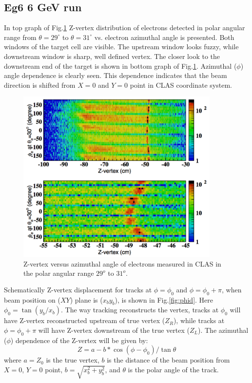 \documentclass[12pt]{article}
\begin{document}
\subsection{Eg6 6 GeV run}

In top graph of Fig.\ref{fig:phiz} Z-vertex distribution of electrons detected in polar angular range from $\theta=29^\circ$ to $\theta =31^\circ$ vs. electron azimuthal angle is presented. Both windows of the target cell are visible. The upstream window looks fuzzy, while downstream window is sharp, well defined vertex. The closer look to the downstream end of the target is shown in bottom graph of Fig.\ref{fig:phiz}. Azimuthal ($\phi$) angle dependence is clearly seen. This dependence indicates that the beam direction is shifted from $X=0$ and $Y=0$ point in CLAS coordinate system.    

\begin{figure}[htb]
\begin{center}
\includegraphics[width=0.9\textwidth]{phi_z_eg6.pdf}
\caption{Z-vertex versus azimuthal angle of electrons measured in CLAS in the polar angular range $29^o$ to $31^o$.}
\label{fig:phiz}
\end{center}
\end{figure}

Schematically Z-vertex displacement for tracks at $\phi=\phi_0$ and $\phi=\phi_0+\pi$, when beam position on ($XY$) plane is ($x_by_b$),  is shown in Fig.\ref{fig:phid}. Here $\phi_0=\tan({y_b/x_b})$. The way tracking reconstructs the vertex, tracks at $\phi_0$ will have Z-vertex reconstructed upstream of true vertex ($Z_R$), while tracks at $\phi=\phi_0+\pi$ will have Z-vertex downstream of the true vertex ($Z_L$).  The azimuthal ($\phi$) dependence of the Z-vertex will be given by:
\begin{equation}
Z=a-b*\cos(\phi-\phi_0)/\tan\theta
\label{zfun}
\end{equation}
where $a=Z_0$ is the true vertex, $b$ is the distance of the beam position from $X=0$, $Y=0$ point, $b=\sqrt{x_b^2+y_b^2}$, and $\theta$ is the polar angle of the track.
\end{document}

